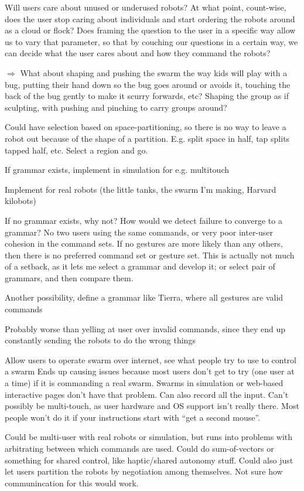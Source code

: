 \documentclass[]{article}
\begin{document}
Will users care about unused or underused robots? At what point, count-wise, does the user stop caring about individuals and start ordering the robots around as a cloud or flock? Does framing the question to the user in a specific way allow us to vary that parameter, so that by couching our questions in a certain way, we can decide what the user cares about and how they command the robots?

$\Rightarrow$ What about shaping and pushing the swarm the way kids will play with a bug, putting their hand down so the bug goes around or avoids it, touching the back of the bug gently to make it scurry forwards, etc? Shaping the group as if sculpting, with pushing and pinching to carry groups around?

Could have selection based on space-partitioning, so there is no way to leave a robot out because of the shape of a partition. E.g. split space in half, tap splits tapped half, etc. Select a region and go. 

If grammar exists, implement in simulation for e.g. multitouch

Implement for real robots (the little tanks, the swarm I'm making, Harvard kilobots)

If no grammar exists, why not?
How would we detect failure to converge to a grammar? No two users using the same commands, or very poor inter-user cohesion in the command sets. If no gestures are more likely than any others, then there is no preferred command set or gesture set. 
This is actually not much of a setback, as it lets me select a grammar and develop it; or select pair of grammars, and then compare them.

Another possibility, define a grammar like Tierra, where all gestures are valid commands

Probably worse than yelling at user over invalid commands, since they end up constantly sending the robots to do the wrong things

Allow users to operate swarm over internet, see what people try to use to control a swarm
Ends up causing issues because most users don't get to try (one user at a time) if it is commanding a real swarm. Swarms in simulation or web-based interactive pages don't have that problem. Can also record all the input. 
Can't possibly be multi-touch, as user hardware and OS support isn't really there. Most people won't do it if your instructions start with ``get a second mouse''. 

Could be multi-user with real robots or simulation, but runs into problems with arbitrating between which commands are used. Could do sum-of-vectors or something for shared control, like haptic/shared autonomy stuff. Could also just let users partition the robots by negotiation among themselves. Not sure how communincation for this would work. 
\end{document}

